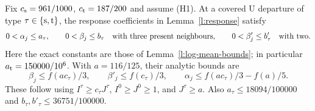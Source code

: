 \begin{lemma}\label{l:response-typed}
Fix \(c_{\rm s}=961/1000\), \(c_{\rm t}=187/200\) and assume (H1).
At a covered \(\mathrm U\) departure of type \(\tau\in\{{\rm s},{\rm t}\}\),
the response coefficients in Lemma~\ref{l:response} satisfy
\[
 0<\alpha_j\le a_\tau,\qquad 0<\beta_j\le b_\tau
       \quad\hbox{with three present neighbours},\qquad
 0<\beta'_j\le b'_\tau\quad\hbox{with two}.
\]
Here the exact constants are those of Lemma~\ref{l:log-mean-bounds};
in particular \(a_{\rm t}=150000/10^6\).
With \(a=116/125\), their analytic bounds are
\[
 \beta_j\le f(ac_\tau)/3,\qquad
 \beta'_j\le f(c_\tau)/3,\qquad
 \alpha_j\le f(ac_\tau)/3-f(a)/5.
\]
These follow using \(I^\tau\ge c_\tau J^\tau\),
\(I^0\ge J^0\ge1\), and \(J^\tau\ge a\).
Also \(a_\tau\le18094/100000\) and
\(b_\tau,b'_\tau\le36751/100000\).
\end{lemma}

